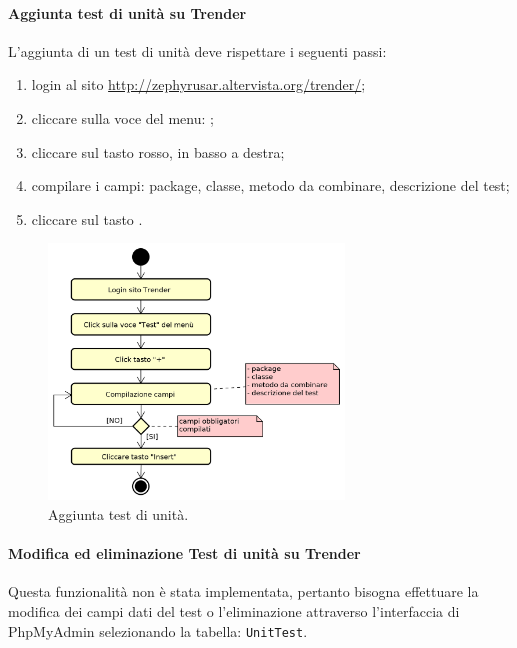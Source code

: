 		\paragraph{Aggiunta test di unità su Trender} \label{sec:traccTuni}
		L'aggiunta di un test di unità deve rispettare i seguenti passi:
		\begin{enumerate}
			\item login al sito \url{http://zephyrusar.altervista.org/trender/};
			\item cliccare sulla voce del menu: ;
			\item cliccare sul tasto \hicode{+} rosso, in basso a destra;
			\item compilare i campi: package, classe, metodo da combinare, descrizione del test;
			\item cliccare sul tasto .
		\end{enumerate}
		\begin{figure}[H]
			\centering
			\includegraphics[width=0.7\textwidth]{img/AggiuntaTestUnit}
			\caption{Aggiunta test di unità.}
		\end{figure}

		\paragraph{Modifica ed eliminazione Test di unità su Trender}
		Questa funzionalità non è stata implementata, pertanto bisogna effettuare la modifica dei campi dati del test o l'eliminazione attraverso l'interfaccia di PhpMyAdmin selezionando la tabella: \texttt{UnitTest}.
